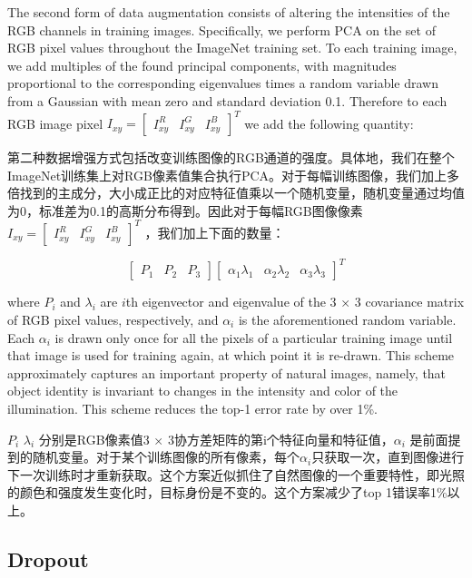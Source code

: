 \documentclass[12pt,a4paper,UTF8,twoside]{book}
\begin{document}
The second form of data augmentation consists of altering the intensities of the RGB channels in training images. Specifically, we perform PCA on the set of RGB pixel values throughout the ImageNet training set. To each training image, we add multiples of the found principal components, with magnitudes proportional to the corresponding eigenvalues times a random variable drawn from a Gaussian with mean zero and standard deviation 0.1. Therefore to each RGB image pixel \(I_{xy} = \left[ \begin{matrix} I^R_{xy} & I^G_{xy} & I^B_{xy} \end{matrix} \right]^T\) we add the following quantity:

第二种数据增强方式包括改变训练图像的RGB通道的强度。具体地，我们在整个ImageNet训练集上对RGB像素值集合执行PCA。对于每幅训练图像，我们加上多倍找到的主成分，大小成正比的对应特征值乘以一个随机变量，随机变量通过均值为0，标准差为0.1的高斯分布得到。因此对于每幅RGB图像像素 \(I_{xy} = \left[ \begin{matrix} I^R_{xy} & I^G_{xy} & I^B_{xy} \end{matrix} \right]^T\) ，我们加上下面的数量：

\[
\left[ \begin{matrix} P_1 & P_2 & P_3 \end{matrix} \right]\left[ \begin{matrix} \alpha_1\lambda_1 & \alpha_2\lambda_2 & \alpha_3\lambda_3 \end{matrix} \right]^T
\]

where \(P_i\) and \(\lambda_i\) are \(i\)th eigenvector and eigenvalue of the 3 × 3 covariance matrix of RGB pixel values, respectively, and \(\alpha_i\) is the aforementioned random variable. Each \(\alpha_i\) is drawn only once for all the pixels of a particular training image until that image is used for training again, at which point it is re-drawn. This scheme approximately captures an important property of natural images, namely, that object identity is invariant to changes in the intensity and color of the illumination. This scheme reduces the top-1 error rate by over 1\%.

\(P_i\) \(\lambda_i\) 分别是RGB像素值3 × 3协方差矩阵的第i个特征向量和特征值，\(\alpha_i\) 是前面提到的随机变量。对于某个训练图像的所有像素，每个\(\alpha_i\)只获取一次，直到图像进行下一次训练时才重新获取。这个方案近似抓住了自然图像的一个重要特性，即光照的颜色和强度发生变化时，目标身份是不变的。这个方案减少了top 1错误率1\%以上。

\hypertarget{dropout}{%
\subsection{Dropout}\label{dropout}}
\end{document}

